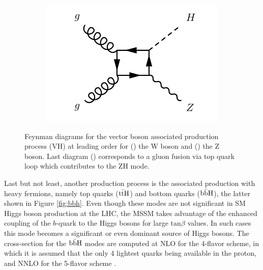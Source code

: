 \begin{figure}
\begin{subfigure}[b]{0.3\textwidth}
\end{subfigure}%
\begin{subfigure}[b]{0.3\textwidth}
  \centering
  \includegraphics[width=\textwidth]{Images/VH3.pdf}
  \caption{\label{fig:vh3}}
\end{subfigure}
\caption{Feynman diagrams for the vector boson associated production process (VH) at leading order for () the W boson and () the Z boson. Last diagram () corresponds to a gluon fusion via top quark loop which contributes to the ZH mode.}
\label{fig:vh}
\end{figure}


Last but not least, another production process is the associated production with heavy fermions, namely top quarks ($\mathrm{t\Bar{t}H}$) and bottom quarks ($\mathrm{b\Bar{b}H}$), the latter shown in Figure \ref{fig:bbh}. Even though these modes are not significant in SM Higgs boson production at the LHC, the MSSM takes advantage of the enhanced coupling of the $b$-quark to the Higgs bosons for large $\mathrm{tan} \beta$ values. In such cases this mode becomes a significant or even dominant source of Higgs bosons. The cross-section for the $\mathrm{b\Bar{b}H}$ modes are computed at NLO for the 4-flavor scheme, in which it is assumed that the only 4 lightest quarks being available in the proton, and NNLO for the 5-flavor scheme \cite{deFlorian:2227475}.


